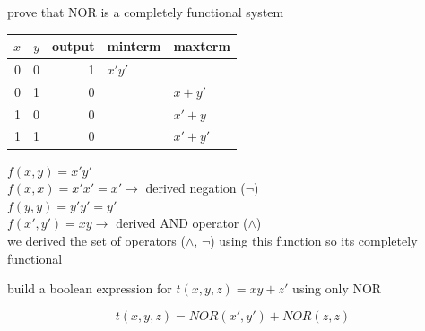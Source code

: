 \documentclass[a4paper,12pt]{article}
\begin{document}
\begin{question}
prove that NOR is a completely functional system\\[0pt]
\begin{answer}
\begin{center}
\begin{tabular}{rrrll}
\(x\) & \(y\) & output & minterm & maxterm\\[0pt]
\hline
0 & 0 & 1 & \(x'y'\) & \\[0pt]
0 & 1 & 0 &  & \(x+y'\)\\[0pt]
1 & 0 & 0 &  & \(x'+y\)\\[0pt]
1 & 1 & 0 &  & \(x'+y'\)\\[0pt]
\end{tabular}
\end{center}
\(f(x,y)=x'y'\)\\[0pt]
\(f(x,x)=x'x'=x' \longrightarrow\) derived negation (\(\lnot\))\\[0pt]
\(f(y,y)=y'y'=y'\)\\[0pt]
\(f(x',y')=xy \longrightarrow\) derived AND operator (\(\land\))\\[0pt]
we derived the set of operators (\(\land\), \(\lnot\)) using this function so its completely functional\\[0pt]
\end{answer}
\begin{subquestion}
build a boolean expression for \(t(x,y,z) = xy+z'\) using only NOR\\[0pt]
\begin{answer}
\[t(x,y,z)=NOR(x',y')+NOR(z,z)\]\\[0pt]
\end{answer}
\end{subquestion}
\end{question}
\end{document}
